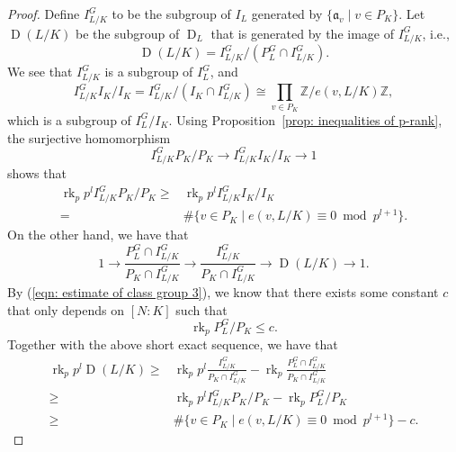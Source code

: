 \documentclass{amsart}
\numberwithin{equation}{section}
\theoremstyle{plain}
\theoremstyle{definition}
\theoremstyle{remark}
\begin{document}
\begin{proof}
	Define $I_{L/K}^G$ to be the subgroup of $I_L$ generated by $\{\mathfrak{a}_v\mid v\in P_K\}$.
	Let $\operatorname{D}(L/K)$ be the subgroup of $\operatorname{D}_L$ that is generated by the image of $I_{L/K}^G$, i.e.,
	\begin{equation*}
		\operatorname{D}(L/K)=I_{L/K}^G/(P_L^G\cap I_{L/K}^G).
	\end{equation*}
	We see that $I_{L/K}^G$ is a subgroup of $I_L^G$, and
	\begin{equation*}
		I_{L/K}^G I_K/I_K=I_{L/K}^G/(I_K\cap I_{L/K}^G)\cong\prod_{v\in P_K}\mathbb{Z}/e(v,L/K)\mathbb{Z},
	\end{equation*} 
	which is a subgroup of $I_L^G/I_K$.
	Using Proposition~\ref{prop: inequalities of p-rank}, the surjective homomorphism
	\begin{equation*}
		I_{L/K}^G P_K/P_K\to I_{L/K}^G I_K/I_K\to1
	\end{equation*}
	shows that 
	\begin{equation*}
		\begin{aligned}
			\operatorname{rk}_{p}p^{l}I_{L/K}^GP_K/P_K
			\geq&\operatorname{rk}_{p}p^{l}I_{L/K}^G I_K/I_K
			\\
			=&\#\{v\in P_K\mid e(v,L/K)\equiv0\bmod{p^{l+1}}\}.
		\end{aligned}		
	\end{equation*}
	On the other hand, we have that
	\begin{equation*}
		1\to\frac{P_L^G\cap I_{L/K}^G}{P_K\cap I_{L/K}^G}\to\frac{I_{L/K}^G}{P_K\cap I_{L/K}^G}\to \operatorname{D}(L/K)\to1.
	\end{equation*}
	By (\ref{eqn: estimate of class group 3}), we know that there exists some constant $c$ that only depends on $[N:K]$ such that
	\begin{equation*}
		\operatorname{rk}_{p}P_L^G/P_K\leq c.
	\end{equation*}
	Together with the above short exact sequence, we have that
	\begin{equation*}
		\begin{aligned}
			\operatorname{rk}_pp^{l}\operatorname{D}(L/K)
			\geq&\operatorname{rk}_pp^{l}\frac{I_{L/K}^G}{P_K\cap I_{L/K}^G}-\operatorname{rk}_p\frac{P_L^G\cap I_{L/K}^G}{P_K\cap I_{L/K}^G}
			\\
			\geq&\operatorname{rk}_pp^{l}I_{L/K}^G P_K/P_K-\operatorname{rk}_{p}P_L^G/P_K
			\\
			\geq&\#\{v\in P_K\mid e(v,L/K)\equiv0\bmod{p^{l+1}}\}-c.
		\end{aligned}
	\end{equation*}
\end{proof}
\end{document}

